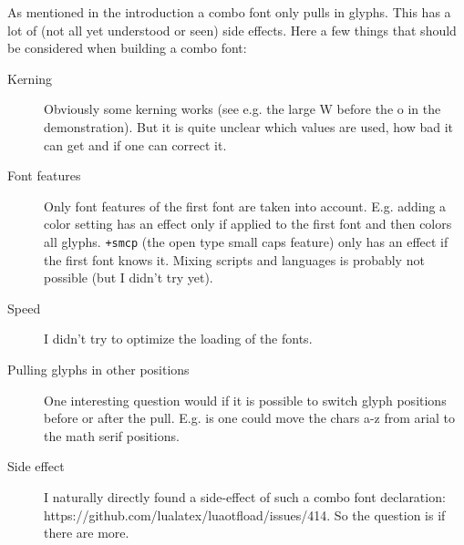 \documentclass[parskip=half-]{scrartcl}
\begin{document}
As mentioned in the introduction a combo font only pulls in glyphs. This has a lot of (not all yet understood or seen) side effects. Here a few things that should be considered when building a combo font:

\begin{description}
  \item[Kerning] Obviously some kerning works (see e.g. the large W before the o in the demonstration). But it is quite unclear which values are used, how bad it can get and if one can correct it.
  \item[Font features] Only font features of the first font are taken into account. E.g. adding a color setting has an effect only if applied to the first font and then colors all glyphs. \verb!+smcp! (the open type small caps feature) only has an effect if the first font knows it. Mixing scripts and languages is probably not possible (but I didn't try yet).
  \item[Speed] I didn't try to optimize the loading of the fonts. 
  \item[Pulling glyphs in other positions] One interesting question would if it is possible to switch glyph positions before or after the pull. E.g. is one could move the chars a-z from arial to the math serif positions. 
  \item[Side effect] I naturally directly found a side-effect of such a combo font declaration: https://github.com/lualatex/luaotfload/issues/414. So the question is if there are more.
\end{description}
\end{document}
